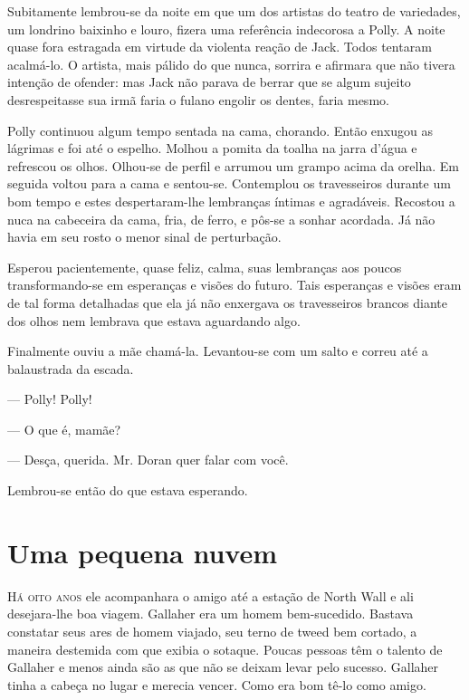 Subitamente lembrou-se da noite em que um dos artistas do teatro de
variedades, um londrino baixinho e louro, fizera uma referência
indecorosa a Polly. A noite quase fora estragada em virtude da
violenta reação de Jack. Todos tentaram acalmá-lo. O artista, mais
pálido do que nunca, sorrira e afirmara que não tivera intenção de
ofender: mas Jack não parava de berrar que se algum sujeito
desrespeitasse sua irmã faria o fulano engolir os dentes, faria
mesmo.

\dotfill\hspace{.7\textwidth}

Polly continuou algum tempo sentada na cama, chorando. Então enxugou
as lágrimas e foi até o espelho. Molhou a pomita da toalha na jarra
d'água e refrescou os olhos. Olhou-se de perfil e arrumou um grampo
acima da orelha. Em seguida voltou para a cama e sentou-se. Contemplou
os travesseiros durante um bom tempo e estes despertaram-lhe
lembranças íntimas e agradáveis. Recostou a nuca na cabeceira da cama,
fria, de ferro, e pôs-se a sonhar acordada. Já não havia em seu rosto
o menor sinal de perturbação.

Esperou pacientemente, quase feliz, calma, suas lembranças aos poucos
transformando-se em esperanças e visões do futuro. Tais esperanças e
visões eram de tal forma detalhadas que ela já não enxergava os
travesseiros brancos diante dos olhos nem lembrava que estava
aguardando algo.

Finalmente ouviu a mãe chamá-la. Levantou-se com um salto e correu até
a balaustrada da escada.

--- Polly! Polly!

--- O que é, mamãe?

--- Desça, querida. Mr. Doran quer falar com você.

Lembrou-se então do que estava esperando.

\chapter{Uma pequena nuvem}

\textsc{Há oito anos} ele acompanhara o amigo até a estação de North Wall e ali
desejara-lhe boa viagem. Gallaher era um homem bem-sucedido. Bastava
constatar seus ares de homem viajado, seu terno de tweed bem cortado,
a maneira destemida com que exibia o sotaque. Poucas pessoas têm o
talento de Gallaher e menos ainda são as que não se deixam levar
pelo sucesso. Gallaher tinha a cabeça no lugar e merecia vencer. Como
era bom tê-lo como amigo.

